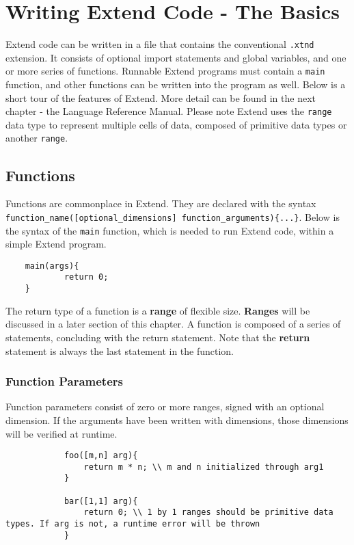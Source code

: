 \section{Writing Extend Code - The Basics}
Extend code can be written in a file that contains the conventional \texttt{.xtnd} extension. It consists of optional import statements and global variables, and one or more series of functions. Runnable Extend programs must contain a \texttt{main} function, and other functions can be written into the program as well.
\newline \newline
Below is a short tour of the features of Extend. More detail can be found in the next chapter - the Language Reference Manual. Please note Extend uses the \texttt{range} data type to represent multiple cells of data, composed of primitive data types or another \texttt{range}.

	\subsection{Functions}
	Functions are commonplace in Extend. They are declared with the syntax \texttt{function\_name([optional\_dimensions] function\_arguments)\{...\}}. Below is the syntax of the \texttt{main} function, which is needed to run Extend code, within a simple Extend program.

	\begin{lstlisting}
	main(args){
			return 0;
	}
	\end{lstlisting}

	\medskip \noindent
 	The return type of a function is a \textbf{range} of flexible size. \textbf{Ranges} will be discussed in a later section of this chapter. A function is composed of a series of statements, concluding with the return statement.
	Note that the \textbf{return} statement is always the last statement in the function.

		\subsubsection{Function Parameters}
		Function parameters consist of zero or more ranges, signed with an optional dimension. If the arguments have been written with dimensions, those dimensions will be verified at runtime.
		\begin{lstlisting}
			foo([m,n] arg){
				return m * n; \\ m and n initialized through arg1
			}

			bar([1,1] arg){
				return 0; \\ 1 by 1 ranges should be primitive data types. If arg is not, a runtime error will be thrown
			}
		\end{lstlisting}

